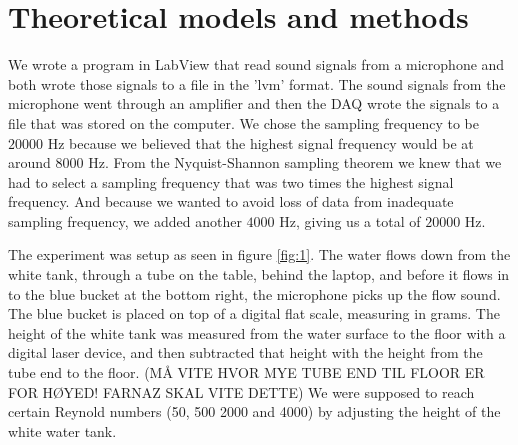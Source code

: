 \documentclass[english,a4paper,12pt]{article}
\begin{document}
\section*{Theoretical models and methods}
We wrote a program in LabView that read sound signals from a microphone and both wrote those signals to a file in the 'lvm' format. The sound signals from the microphone went through an amplifier and then the DAQ wrote the signals to a file that was stored on the computer. We chose the sampling frequency to be $20000$ Hz because we believed that the highest signal frequency would be at around $8000$ Hz. From the Nyquist-Shannon sampling theorem we knew that we had to select a sampling frequency that was two times the highest signal frequency. And because we wanted to avoid loss of data from inadequate sampling frequency, we added another $4000$ Hz, giving us a total of $20000$ Hz. \bigskip

The experiment was setup as seen in figure \ref{fig:1}. The water flows down from the white tank, through a tube on the table, behind the laptop, and before it flows in to the blue bucket at the bottom right, the microphone picks up the flow sound. The blue bucket is placed on top of a digital flat scale, measuring in grams. The height of the white tank was measured from the water surface to the floor with a digital laser device, and then subtracted that height with the height from the tube end to the floor. (MÅ VITE HVOR MYE TUBE END TIL FLOOR ER FOR HØYED! FARNAZ SKAL VITE DETTE) We were supposed to reach certain Reynold numbers (50, 500 2000 and 4000) by adjusting the height of the white water tank. \bigskip
\end{document}
